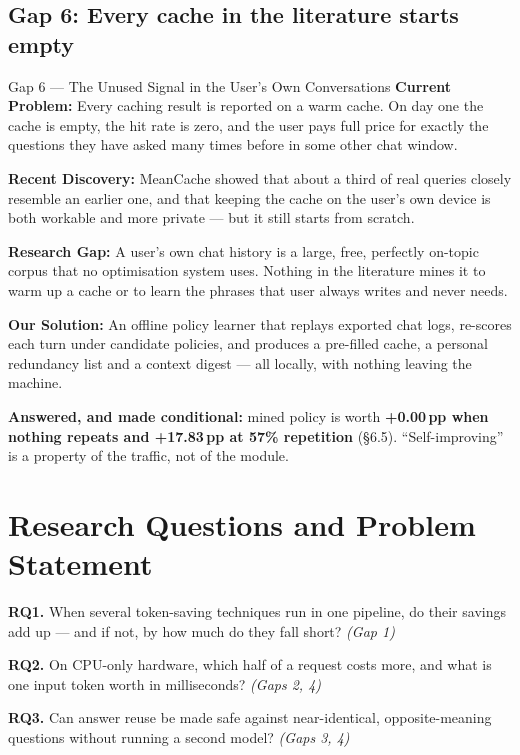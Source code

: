 \documentclass[11pt,a4paper]{article}
\newcommand{\lbl}[1]{\textcolor{accent}{\textbf{#1}}}
\begin{document}
\subsection{Gap 6: Every cache in the literature starts empty}
\begin{gap}{Gap 6 --- The Unused Signal in the User's Own Conversations}
\lbl{Current Problem:} Every caching result is reported on a warm cache. On day one
the cache is empty, the hit rate is zero, and the user pays full price for exactly the
questions they have asked many times before in some other chat window.

\lbl{Recent Discovery:} MeanCache showed that about a third of real queries closely
resemble an earlier one, and that keeping the cache on the user's own device is both
workable and more private --- but it still starts from scratch.

\lbl{Research Gap:} A user's own chat history is a large, free, perfectly on-topic
corpus that no optimisation system uses. Nothing in the literature mines it to warm up
a cache or to learn the phrases that user always writes and never needs.

\lbl{Our Solution:} An offline policy learner that replays exported chat logs,
re-scores each turn under candidate policies, and produces a pre-filled cache, a
personal redundancy list and a context digest --- all locally, with nothing leaving the
machine.
\end{gap}
\textbf{Answered, and made conditional:} mined policy is worth \textbf{+0.00\,pp when
nothing repeats and +17.83\,pp at 57\% repetition} (\S6.5). ``Self-improving'' is a
property of the traffic, not of the module.

\section{Research Questions and Problem Statement}

\textbf{RQ1.} When several token-saving techniques run in one pipeline, do their
savings add up --- and if not, by how much do they fall short? \emph{(Gap 1)}

\textbf{RQ2.} On CPU-only hardware, which half of a request costs more, and what is
one input token worth in milliseconds? \emph{(Gaps 2, 4)}

\textbf{RQ3.} Can answer reuse be made safe against near-identical, opposite-meaning
questions without running a second model? \emph{(Gaps 3, 4)}
\end{document}
